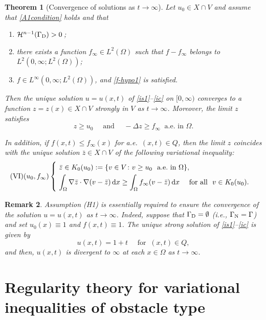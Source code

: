 \documentclass[reqno,10pt]{amsart}
\newtheorem{Th}{Theorem}[section]
\newtheorem{Rem}[Th]{Remark}
\begin{document}
\begin{Th}[Convergence of solutions as $t \to \infty$]\label{T:asp}
 Let $u_0 \in X \cap V$ and assume that \eqref{A1condition} holds and that
\begin{enumerate}[{\rm (H1)}]
 \item
      ${{\mathcal H}}^{n-1}({{\Gamma_{\rm\scriptsize D}}}) > 0$\,\/{\rm ;}
 \item
      there exists a function $f_\infty \in L^2(\Omega)$ such
      that $f - f_\infty$ belongs to $L^2(0,\infty;L^2(\Omega))$\/{\rm ;}
 \item 
      $f \in L^\infty(0,\infty ; L^2(\Omega))$, and \eqref{f-hypo1} is
      satisfied. 
\end{enumerate}
 Then the unique solution $u = u(x,t)$ of \eqref{is1}--\eqref{ic} on
 $[0,\infty)$ converges to a function ${z} =
 {z}(x) \in X \cap V$ strongly in $V$ as $t \to \infty$. Moreover, the
 limit ${z}$ satisfies
$$
 {z} \geq u_0 \quad \mbox{ and } \quad - \Delta {z} \geq f_\infty
 \ \mbox{ a.e.~in } \Omega.
$$
 
 In addition, if $f(x,t) \leq f_\infty(x)$ for a.e.~$(x,t) \in Q$, then
 the limit ${z}$ coincides with the unique solution $\bar {z} \in X
 \cap V$ of the following variational
 inequality\/{\rm :}
$$
\mbox{\rm (VI)($u_0, f_\infty$)}
\begin{cases}
\ \displaystyle \bar {z} \in K_0(u_0) := \{ v \in V \colon v \geq u_0
 \ \mbox{ a.e.~in } \Omega\},\\[1mm]
\ \displaystyle \int_\Omega \nabla \bar {z} \cdot \nabla (v -
 \bar {z}) \, {\text{\rm d}} x
\geq \int_\Omega f_\infty (v - \bar {z}) \, {\text{\rm d}} x \quad \mbox{ for all
 } \ v \in K_0(u_0).
\end{cases}
$$
\end{Th}

\begin{Rem}
{\rm
Assumption (H1) is essentially required to ensure the convergence of
the solution $u = u(x,t)$ as $t \to \infty$. Indeed, suppose that
 ${{\Gamma_{\rm\scriptsize D}}} = \emptyset$ (i.e., ${{\Gamma_{\rm\scriptsize N}}} = \Gamma$) and set $u_0(x) \equiv
 1$ and $f(x,t) \equiv 1$. The unique strong solution of
 \eqref{is1}--\eqref{ic} is given by
$$
u(x,t) = 1 + t \quad \mbox{ for } \ (x,t) \in Q,
$$
and then, $u(x,t)$ is divergent to $\infty$ at each $x \in \Omega$ as $t
 \to \infty$.
}
\end{Rem}

\section{Regularity theory for variational inequalities of obstacle
 type}\label{sec-vi}
\end{document}

